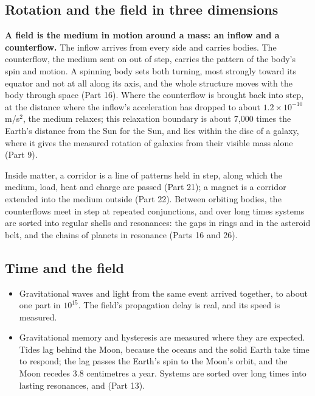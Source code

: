 \subsection{Rotation and the field in three dimensions}

\begin{hypbar}
\textbf{A field is the medium in motion around a mass: an inflow and a counterflow.} The inflow arrives from every side and carries bodies. The counterflow, the medium sent on out of step, carries the pattern of the body's spin and motion. A spinning body sets both turning, most strongly toward its equator and not at all along its axis, and the whole structure moves with the body through space (Part 16). Where the counterflow is brought back into step, at the distance where the inflow's acceleration has dropped to about $1.2\times10^{-10}$ m/s$^2$, the medium relaxes; this relaxation boundary is about 7,000 times the Earth's distance from the Sun for the Sun, and lies within the disc of a galaxy, where it gives the measured rotation of galaxies from their visible mass alone (Part 9).\footnotemark{}
\end{hypbar}

 Inside matter, a corridor is a line of patterns held in step, along which the medium, load, heat and charge are passed (Part 21); a magnet is a corridor extended into the medium outside (Part 22). Between orbiting bodies, the counterflows meet in step at repeated conjunctions, and over long times systems are sorted into regular shells and resonances: the gaps in rings and in the asteroid belt, and the chains of planets in resonance (Parts 16 and 26).

\subsection{Time and the field}

\begin{itemize}
\item {} Gravitational waves and light from the same event arrived together, to about one part in $10^{15}$. The field's propagation delay is real, and its speed is measured.
\item {} Gravitational memory and hysteresis are measured where they are expected. Tides lag behind the Moon, because the oceans and the solid Earth take time to respond; the lag passes the Earth's spin to the Moon's orbit, and the Moon recedes 3.8 centimetres a year. Systems are sorted over long times into lasting resonances, and  (Part 13).
\end{itemize}

